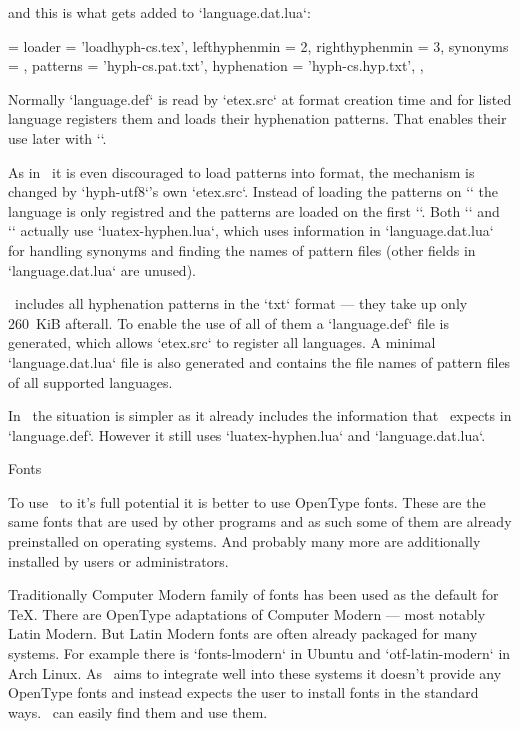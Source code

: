 and this is what gets added to `language.dat.lua`:

\begtt
	['czech'] = {
		loader = 'loadhyph-cs.tex',
		lefthyphenmin = 2,
		righthyphenmin = 3,
		synonyms = {  },
		patterns = 'hyph-cs.pat.txt',
		hyphenation = 'hyph-cs.hyp.txt',
	},
\endtt


Normally `language.def` is read by `etex.src` at format creation time and for
listed language registers them and loads their hyphenation patterns. That
enables their use later with `\uselanguage`.

As in \LuaTeX\ it is even discouraged to load patterns into format, the
mechanism is changed by `hyph-utf8`'s own `etex.src`. Instead of loading the
patterns on `\addlanguage` the language is only registred and the patterns are
loaded on the first `\uselanguage`. Both `\addlanguage` and `\uselangauge`
actually use `luatex-hyphen.lua`, which uses information in `language.dat.lua`
for handling synonyms and finding the names of pattern files (other fields in
`language.dat.lua` are unused).

\MMTeX\ includes all hyphenation patterns in the `txt` format --- they take up
only 260\ KiB afterall. To enable the use of all of them a `language.def` file
is generated, which allows `etex.src` to register all languages. A minimal
`language.dat.lua` file is also generated and contains the file names of
pattern files of all supported languages.

In \OpTeX\ the situation is simpler as it already includes the information that
\eTeX\ expects in  `language.def`. However it still uses `luatex-hyphen.lua`
and `language.dat.lua`.

\sec Fonts

To use \LuaTeX\ to it's full potential it is better to use OpenType fonts.
These are the same fonts that are used by other programs and as such some of
them are already preinstalled on operating systems. And probably many more are
additionally installed by users or administrators.

Traditionally Computer Modern family of fonts has been used as the default for
\TeX. There are OpenType adaptations of Computer Modern --- most notably Latin
Modern. But Latin Modern fonts are often already packaged for many systems. For
example there is `fonts-lmodern` in Ubuntu and `otf-latin-modern` in Arch
Linux. As \MMTeX\ aims to integrate well into these systems it doesn't provide
any OpenType fonts and instead expects the user to install fonts in the
standard ways. \MMTeX\ can easily find them and use them.

